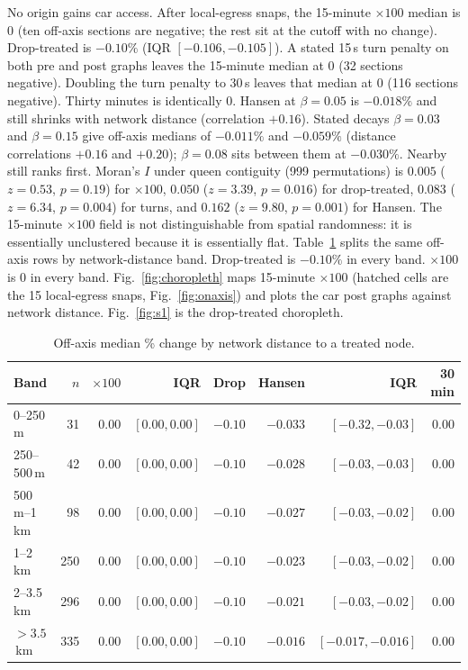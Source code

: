\documentclass[a4paper,fleqn]{cas-dc}
\begin{document}
No origin gains car access. After local-egress snaps, the 15-minute
$\times 100$ median is $0$ (ten off-axis sections are negative; the rest
sit at the cutoff with no change). Drop-treated is $-0.10\%$ (IQR
$[-0.106,-0.105]$). A stated 15\,s turn penalty on both pre and post graphs
leaves the 15-minute median at $0$ (32 sections negative). Doubling the
turn penalty to 30\,s leaves that median at $0$ (116 sections negative).
Thirty minutes is identically $0$. Hansen at $\beta = 0.05$ is $-0.018\%$
and still shrinks with network distance (correlation $+0.16$).
Stated decays $\beta = 0.03$ and $\beta = 0.15$ give off-axis medians of
$-0.011\%$ and $-0.059\%$ (distance correlations $+0.16$ and $+0.20$);
$\beta = 0.08$ sits between them at $-0.030\%$. Nearby still ranks first.
Moran's $I$ under queen contiguity (999 permutations) is $0.005$
($z=0.53$, $p=0.19$) for $\times 100$, $0.050$ ($z=3.39$, $p=0.016$) for
drop-treated, $0.083$ ($z=6.34$, $p=0.004$) for turns, and $0.162$
($z=9.80$, $p=0.001$) for Hansen. The 15-minute $\times 100$ field is not
distinguishable from spatial randomness: it is essentially unclustered
because it is essentially flat. Table~\ref{tab:bands}
splits the same off-axis rows by network-distance band. Drop-treated is
$-0.10\%$ in every band. $\times 100$ is $0$ in every band.
Fig.~\ref{fig:choropleth} maps 15-minute $\times 100$ (hatched cells are the
15 local-egress snaps, Fig.~\ref{fig:onaxis}) and plots the car post graphs
against network distance. Fig.~\ref{fig:s1} is
the drop-treated choropleth.

\begin{table}[t]
\centering
\small
\caption{Off-axis median \% change by network distance to a treated node.}
\label{tab:bands}
\begin{tabular}{lrrrrrrr}
\toprule
Band & $n$ & $\times 100$ & IQR & Drop & Hansen & IQR & 30 min \\
\midrule
0--250\,m & 31 & $0.00$ & $[0.00,0.00]$ & $-0.10$ & $-0.033$ & $[-0.32,-0.03]$ & $0.00$ \\
250--500\,m & 42 & $0.00$ & $[0.00,0.00]$ & $-0.10$ & $-0.028$ & $[-0.03,-0.03]$ & $0.00$ \\
500\,m--1\,km & 98 & $0.00$ & $[0.00,0.00]$ & $-0.10$ & $-0.027$ & $[-0.03,-0.02]$ & $0.00$ \\
1--2\,km & 250 & $0.00$ & $[0.00,0.00]$ & $-0.10$ & $-0.023$ & $[-0.03,-0.02]$ & $0.00$ \\
2--3.5\,km & 296 & $0.00$ & $[0.00,0.00]$ & $-0.10$ & $-0.021$ & $[-0.03,-0.02]$ & $0.00$ \\
${>}3.5$\,km & 335 & $0.00$ & $[0.00,0.00]$ & $-0.10$ & $-0.016$ & $[-0.017,-0.016]$ & $0.00$ \\
\bottomrule
\end{tabular}
\end{table}
\end{document}
